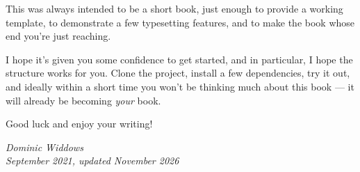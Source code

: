 This was always intended to be a short book, just enough to provide a working template, to demonstrate
a few typesetting features, and to make the book whose end you're just reaching.

I hope it's given you some confidence to get started, and in particular, I hope the structure works for you.
Clone the project, install a few dependencies, try it out, and ideally within a short time you won't be thinking
much about this book --- it will already be becoming {\em your} book.

Good luck and enjoy your writing!

\begin{flushright}
  {\em Dominic Widdows \\ September 2021, updated November 2026}
\end{flushright}




